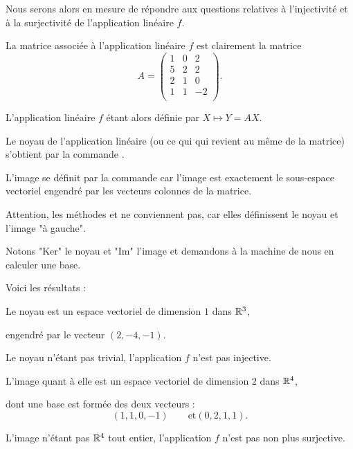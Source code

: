 Nous serons alors en mesure de répondre aux questions relatives à l'injectivité et à la surjectivité de l'application linéaire $f$.


\diapo

La matrice associée à l'application linéaire $f$ est clairement la matrice 
  $$A = \begin{pmatrix}1&0&2\\5&2&2\\2&1&0\\1&1&-2\\\end{pmatrix}.$$
  
\change
  L'application linéaire $f$ étant alors définie par $X \mapsto Y = AX$.

\change 
  Le noyau de l'application linéaire (ou ce qui qui revient au même de la matrice) 
  s'obtient par la commande .
  
\change
L'image se définit par la commande
   car l'image est
  exactement le sous-espace vectoriel engendré par les vecteurs colonnes de la matrice. 
  
 Attention, les méthodes  et  ne conviennent pas, car elles définissent le noyau et l'image "à gauche".  
   
\change
Notons "Ker" le noyau et "Im" l'image et demandons à la machine de nous en calculer une base.

\change
Voici les résultats :

Le noyau est un espace vectoriel de dimension $1$ dans $\mathbb{R}^3$,

\change
engendré par le vecteur $(2, -4, -1)$. 

\change
Le noyau n'étant pas trivial, l'application $f$ n'est pas injective.
  
\change
L'image quant à elle est un espace vectoriel de dimension $2$ dans $\mathbb{R}^4$, 

\change
dont une base   
  est formée des deux vecteurs :
  $$ 
  \left(1, 1, 0, -1\right)\qquad \mbox{et} \left(0,2, 1, 1\right).$$
  
\change
L'image n'étant pas $\mathbb{R}^4$ tout entier, l'application $f$ n'est pas non plus surjective.
  
 

\diapo

